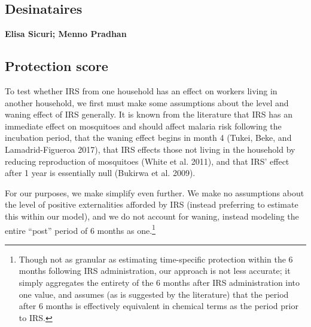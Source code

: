 \documentclass[]{article}
\let\rmarkdownfootnote\footnote%
\def\footnote{\protect\rmarkdownfootnote}
\begin{document}
\noindent{}

\vfill
\null

\subsection*{Desinataires}

\textbf{Elisa Sicuri; Menno Pradhan}

\vspace{3mm}

\newpage

\subsection{Protection score}\label{protection-score}

To test whether IRS from one household has an effect on workers living
in another household, we first must make some assumptions about the
level and waning effect of IRS generally. It is known from the
literature that IRS has an immediate effect on mosquitoes and should
affect malaria risk following the incubation period, that the waning
effect begins in month 4 (Tukei, Beke, and Lamadrid-Figueroa 2017), that
IRS effects those not living in the household by reducing reproduction
of mosquitoes (White et al. 2011), and that IRS' effect after 1 year is
essentially null (Bukirwa et al. 2009).

For our purposes, we make simplify even further. We make no assumptions
about the level of positive externalities afforded by IRS (instead
preferring to estimate this within our model), and we do not account for
waning, instead modeling the entire ``post'' period of 6 months as
one.\footnote{Though not as granular as estimating time-specific protection within the 6 months following IRS administration, our approach is not less accurate; it simply aggregates the entirety of the 6 months after IRS administration into one value, and assumes (as is suggested by the literature) that the period after 6 months is effectively equivalent in chemical terms as the period prior to IRS.}
\end{document}
